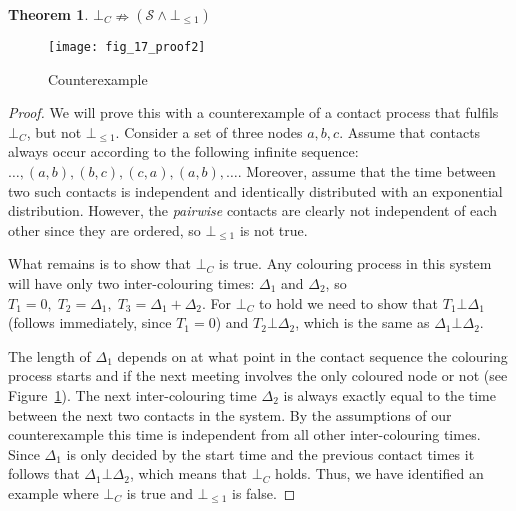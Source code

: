 \documentclass{article}
\newtheorem{theorem}{Theorem}
\begin{document}
\begin{theorem}
  $\bot_{C} \nRightarrow (\mathcal{S} \land \bot_{\le 1})$
\end{theorem}
\begin{figure}[ht]
  \centering
  \texttt{[image: fig\_17\_proof2]}
  \caption{Counterexample}
  \label{fig:counterexample}
\end{figure}
\begin{proof}
  We will prove this with a counterexample of a contact process that
  fulfils $\bot_{C}$, but not $\bot_{\le 1}$. Consider a set of three
  nodes $a,b,c$. Assume that contacts always occur according to the
  following infinite sequence: \newline $\ldots, (a,b), (b,c), (c,a), (a,b),
  \ldots$. Moreover, assume that the time between two such contacts is
  independent and identically distributed with an exponential
  distribution. However, the \emph{pairwise} contacts are clearly not
  independent of each other since they are ordered, so $\bot_{\le 1}$
  is not true.

  What remains is to show that $\bot_{C}$ is true. Any colouring
  process in this system will have only two inter-colouring times:
  $\Delta_1$ and $\Delta_2$, so $T_1 = 0,\; T_2 = \Delta_1,\; T_3 =
  \Delta_1 + \Delta_2$. For $\bot_C$ to hold we need to show that $T_1
  \bot \Delta_1$ (follows immediately, since $T_1 = 0$) and $T_2 \bot
  \Delta_2$, which is the same as $\Delta_1 \bot \Delta_2$.

  The length of $\Delta_1$ depends on at what point in the contact
  sequence the colouring process starts and if the next meeting
  involves the only coloured node or not (see
  Figure~\ref{fig:counterexample}).  The next inter-colouring time
  $\Delta_2$ is always exactly equal to the time between the next two
  contacts in the system. By the assumptions of our counterexample
  this time is independent from all other inter-colouring times. Since
  $\Delta_1$ is only decided by the start time and the previous contact
  times it follows that $\Delta_1 \bot \Delta_2$, which means that
  $\bot_{C}$ holds. Thus, we have identified an example where $\bot_C$
  is true and $\bot_{\le 1}$ is false.

\end{proof}
\end{document}

